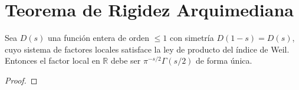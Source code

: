 \section{Teorema de Rigidez Arquimediana}

\begin{theorem}
Sea $D(s)$ una función entera de orden $\leq 1$ con simetría $D(1-s)=D(s)$,
cuyo sistema de factores locales satisface la ley de producto del índice de Weil.
Entonces el factor local en $\mathbb{R}$ debe ser 
$\pi^{-s/2}\Gamma(s/2)$ de forma única.
\end{theorem}

\begin{proof}
\end{proof}
